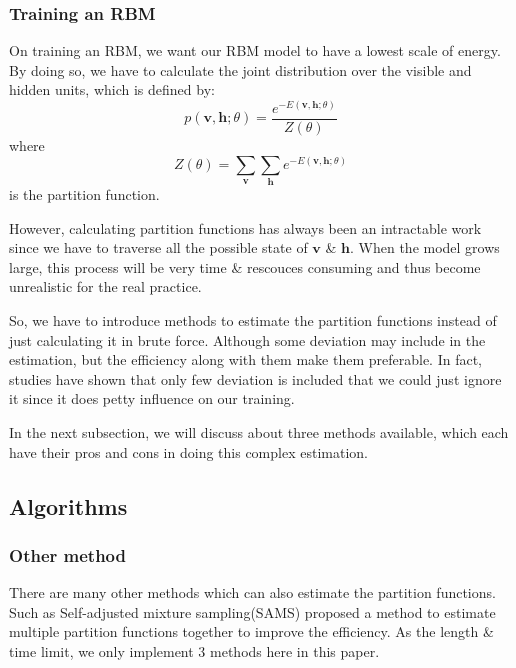 \subsubsection{Training an RBM}
On training an RBM, we want our RBM model to have a lowest scale of energy. By doing so, we have to calculate the joint distribution over the visible and hidden units, which is defined by:
\begin{equation}
	p(\mathbf v,\mathbf h;\theta)=\frac{e^{-E(\mathbf v,\mathbf h;\theta)}}{Z(\theta)}
\end{equation}
where
\begin{equation}
	Z(\theta)=\sum_{\mathbf v} \sum_{\mathbf h} e^{-E(\mathbf v,\mathbf h;\theta)}
\end{equation}
is the partition function.

However, calculating partition functions has always been an intractable work since we have to traverse all the possible state of $\mathbf v$ \& $\mathbf h$.
When the model grows large, this process will be very time \& rescouces consuming and thus become unrealistic for the real practice.

So, we have to introduce methods to estimate the partition functions instead of just calculating it in brute force. Although some deviation may include in the estimation, but the efficiency along with them make them preferable. In fact, studies have shown that only few deviation is included that we could just ignore it since it does petty influence on our training.

In the next subsection, we will discuss about three methods available, which each have their pros and cons in doing this complex estimation.



\subsection{Algorithms}





\subsubsection{Other method}
There are many other methods which can also estimate the partition functions. Such as Self-adjusted mixture sampling(SAMS)\cite{tan2015optimally} proposed a method to estimate multiple partition functions together to improve the efficiency. As the length \& time limit, we only implement 3 methods here in this paper.

